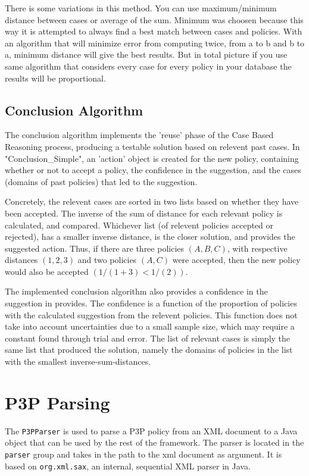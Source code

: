 There is some variations in this method. You can use maximum/minimum distance between cases or average of the sum. Minimum was choosen because this way it is attempted to always find a best match between cases and policies. With an algorithm that will minimize error from computing twice, from a to b and b to a, minimum distance will give the best results. But in total picture if you use same algorithm that considers every case for every policy in your database the results will be proportional.


\subsection{Conclusion Algorithm}

The conclusion algorithm implements the 'reuse' phase of the Case Based Reasoning process, producing a testable solution based on relevent past cases. In "Conclusion\_Simple", an 'action' object is created for the new policy, containing whether or not to accept a policy, the confidence in the suggestion, and the cases (domains of past policies) that led to the suggestion.

Concretely, the relevent cases are sorted in two lists based on whether they have been accepted. The inverse of the sum of distance for each relevant policy is calculated, and compared. Whichever list (of relevent policies accepted or rejected), has a smaller inverse distance, is the closer solution, and provides the suggested action. Thus, if there are three policies $(A,B,C)$, with respective distances $(1,2,3)$ and two policies $(A,C)$ were accepted, then the new policy would also be accepted $(1/(1+3) < 1/(2))$.

The implemented conclusion algorithm also provides a confidence in the suggestion in provides. The confidence is a function of the proportion of policies with the calculated suggestion from the relevent policies. This function does not take into account uncertainties due to a small sample size, which may require a constant found through trial and error. The list of relevant cases is simply the same list that produced the solution, namely the domains of policies in the list with the smallest inverse-sum-distances. 


\section{P3P Parsing}\label{parseImpl}
The \texttt{P3PParser} is used to parse a P3P policy from an XML document to a Java object that can be used by the rest of the framework. The parser is located in the \texttt{parser} group and takes in the path to the xml document as argument. It is based on \texttt{org.xml.sax}, an internal, sequential XML parser in Java.

